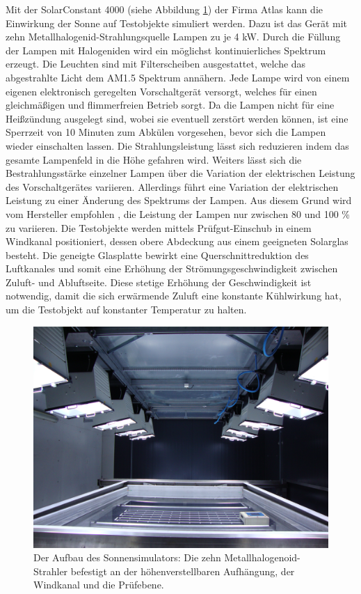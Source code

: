 \documentclass[a4paper,bibtotoc,oneside]{scrbook}
\begin{document}
Mit der SolarConstant 4000 (siehe Abbildung \ref{sunsim}) der Firma Atlas kann die Einwirkung der Sonne auf Testobjekte simuliert werden. Dazu ist das Gerät mit zehn Metallhalogenid-Strahlungsquelle Lampen zu je 4 kW. Durch die Füllung der Lampen mit Halogeniden wird ein möglichst kontinuierliches Spektrum erzeugt. Die Leuchten sind mit Filterscheiben ausgestattet, welche das abgestrahlte Licht dem AM1.5 Spektrum annähern.
Jede Lampe wird von einem eigenen elektronisch geregelten Vorschaltgerät versorgt, welches für einen gleichmäßigen und flimmerfreien Betrieb sorgt.
Da die Lampen nicht für eine Heißzündung ausgelegt sind, wobei sie eventuell zerstört werden können, ist eine Sperrzeit von 10 Minuten zum Abkülen vorgesehen, bevor sich die Lampen wieder einschalten lassen.
Die Strahlungsleistung lässt sich reduzieren indem das gesamte Lampenfeld in die Höhe gefahren wird.
Weiters lässt sich die Bestrahlungsstärke einzelner Lampen über die Variation der elektrischen Leistung des Vorschaltgerätes variieren.
Allerdings führt eine Variation der elektrischen Leistung zu einer Änderung des Spektrums der Lampen. Aus diesem Grund wird vom Hersteller empfohlen \cite{atlas}, die Leistung der Lampen nur zwischen 80 und 100 \% zu variieren.
Die Testobjekte werden mittels Prüfgut-Einschub in einem Windkanal positioniert, dessen obere Abdeckung aus einem geeigneten Solarglas besteht. Die geneigte Glasplatte bewirkt eine Querschnittreduktion des Luftkanales und somit eine Erhöhung der Strömungsgeschwindigkeit zwischen Zuluft- und Abluftseite. Diese stetige Erhöhung der Geschwindigkeit ist notwendig, damit die sich erwärmende Zuluft eine konstante Kühlwirkung hat, um die Testobjekt auf konstanter Temperatur zu halten.


\begin{figure}[htbp]
\centering
\includegraphics[width=125mm]{img/sunsimulator.jpg}
\caption[Sonnensimulator]{Der Aufbau des Sonnensimulators: Die zehn Metallhalogenoid-Strahler befestigt an der höhenverstellbaren Aufhängung, der Windkanal und die Prüfebene.}\label{sunsim}
\end{figure}
\end{document}
